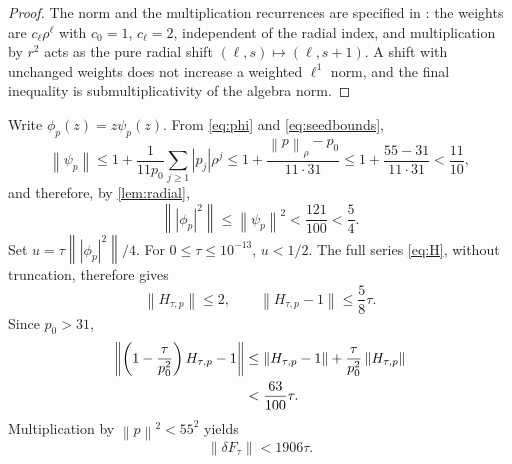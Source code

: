 \documentclass[11pt]{amsart}
\newcommand{\norm}[1]{\left\lVert #1\right\rVert}
\newcommand{\abs}[1]{\left\lvert #1\right\rvert}
\begin{document}
\begin{proof}
The norm and the multiplication recurrences are specified in
\cite[Validation Specification, \S\S2 and~4]{ColbrookStepaniantsCert2026}:
the weights are $c_\ell\rho^\ell$ with $c_0=1$, $c_\ell=2$, independent of
the radial index, and multiplication by $r^2$ acts as the pure radial shift
$(\ell,s)\mapsto(\ell,s+1)$.  A shift with unchanged weights does not
increase a weighted $\ell^1$ norm, and the final inequality is
submultiplicativity of the algebra norm.
\end{proof}

Write $\phi_p(z)=z\psi_p(z)$.  From \eqref{eq:phi} and
\eqref{eq:seedbounds},
\begin{equation}\label{eq:psi}
  \norm{\psi_p}
  \le1+\frac1{11p_0}\sum_{j\ge1}\abs{p_j}\rho^j
  \le1+\frac{\norm p_\rho-p_0}{11\cdot31}
  \le1+\frac{55-31}{11\cdot31}
  <\frac{11}{10},
\end{equation}
and therefore, by \cref{lem:radial},
\begin{equation}\label{eq:phisq}
  \norm{\abs{\phi_p}^2}\le\norm{\psi_p}^2<\frac{121}{100}<\frac54.
\end{equation}
Set $u=\tau\norm{\abs{\phi_p}^2}/4$.  For
$0\le\tau\le10^{-13}$, $u<1/2$.  The full series \eqref{eq:H}, without
truncation, therefore gives
\begin{equation}\label{eq:Hbounds}
  \norm{H_{\tau,p}}\le2,
  \qquad
  \norm{H_{\tau,p}-1}\le\frac58\tau.
\end{equation}
Since $p_0>31$,
\begin{align}
 \norm{\left(1-\frac\tau{p_0^2}\right)H_{\tau,p}-1}
 &\le \norm{H_{\tau,p}-1}
      +\frac\tau{p_0^2}\norm{H_{\tau,p}}\notag\\
 &<\frac{63}{100}\tau.
 \label{eq:Bbound}
\end{align}
Multiplication by $\norm p^2<55^2$ yields
\begin{equation}\label{eq:value}
  \boxed{\norm{\delta F_\tau}<1906\tau.}
\end{equation}
\end{document}
